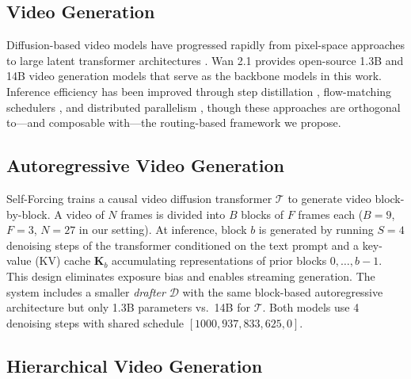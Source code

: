 \documentclass{article}
\newcommand{\Drafter}{\mathcal{D}}
\newcommand{\Target}{\mathcal{T}}
\begin{document}
\subsection{Video Generation}

Diffusion-based video models have progressed rapidly from pixel-space
approaches \citep{yang2024video} to large latent transformer architectures
\citep{openaisora2024,moviegen2024}.
Wan 2.1 \citep{wan2025} provides open-source 1.3B and 14B video generation
models that serve as the backbone models in this work.
Inference efficiency has been improved through step distillation
\citep{yin2024onestepdiffusion}, flow-matching schedulers
\citep{liu2023flow}, and distributed parallelism \citep{he2024distrifusion},
though these approaches are orthogonal to---and composable with---the
routing-based framework we propose.

\subsection{Autoregressive Video Generation}

Self-Forcing \citep{selfforcing2025} trains a causal video diffusion
transformer $\Target$ to generate video block-by-block.
A video of $N$ frames is divided into $B$ blocks of $F$ frames each
($B{=}9$, $F{=}3$, $N{=}27$ in our setting).
At inference, block $b$ is generated by running $S{=}4$ denoising steps of
the transformer conditioned on the text prompt and a key-value (KV) cache
$\mathbf{K}_b$ accumulating representations of prior blocks $0,\ldots,b-1$.
This design eliminates exposure bias and enables streaming generation.
The system includes a smaller \emph{drafter} $\Drafter$ with the same
block-based autoregressive architecture but only 1.3B parameters vs.\ 14B
for $\Target$.
Both models use 4 denoising steps with shared schedule
$[1000, 937, 833, 625, 0]$.

\subsection{Hierarchical Video Generation}
\end{document}
